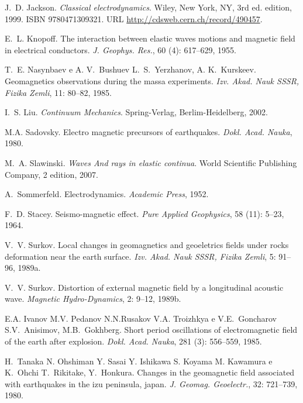 \documentclass[12pt,a4paper,openany]{abntex2}
\begin{document}
\begin{thebibliography}{25}
J.~D. Jackson.
\newblock \emph{Classical electrodynamics}.
\newblock Wiley, New York, {NY}, 3rd ed. edition, 1999.
\newblock ISBN 9780471309321.
\newblock URL \url{http://cdsweb.cern.ch/record/490457}.

E.~L. Knopoff.
\newblock The interaction between elastic waves motions and magnetic field in
  electrical conductors.
\newblock \emph{J. Geophys. Res.}, 60 (4): 617--629, 1955.

T.~E. Nasynbaev e A. V.~Bushuev L.~S.~Yerzhanov, A. K.~Kurskeev.
\newblock Geomagnetics observations during the massa experiments.
\newblock \emph{Izv. Akad. Nauk SSSR, Fizika Zemli}, 11: 80--82, 1985.

I.~S. Liu.
\newblock \emph{Continuum Mechanics}.
\newblock Spring-Verlag, Berlim-Heidelberg, 2002.

M.A. Sadovsky.
\newblock Electro magnetic precursors of earthquakes.
\newblock \emph{Dokl. Acad. Nauka}, 1980.

M.~A. Slawinski.
\newblock \emph{Waves And rays in elastic continua}.
\newblock World Scientific Publishing Company, 2 edition, 2007.


A.~Sommerfeld.
\newblock Electrodynamics.
\newblock \emph{Academic Press}, 1952.

F.~D. Stacey.
\newblock Seismo-magnetic effect.
\newblock \emph{Pure Applied Geophysics}, 58 (11): 5--23,
  1964.

V.~V. Surkov.
\newblock Local changes in geomagnetics and geoeletrics fields under rocks
  deformation near the earth surface.
\newblock \emph{Izv. Akad. Nauk SSSR, Fizika Zemli}, 5: 91--96, 1989a.

V.~V. Surkov.
\newblock Distortion of external magnetic field by a longitudinal acoustic
  wave.
\newblock \emph{Magnetic Hydro-Dynamics}, 2: 9--12, 1989b.

E.A. Ivanov M.V. Pedanov N.N.Rusakov V.A. Troizhkya e V.E.~Goncharov
  S.V.~Anisimov, M.B.~Gokhberg.
\newblock Short period oscillations of electromagnetic field of the earth after
  explosion.
\newblock \emph{Dokl. Acad. Nauka}, 281 (3): 556--559, 1985.

H.~Tanaka N. Ohshiman Y. Sasai Y. Ishikawa S. Koyama M. Kawamura e K.~Ohchi
  T.~Rikitake, Y.~Honkura.
\newblock Changes in the geomagnetic field associated with earthquakes in the
  izu peninsula, japan.
\newblock \emph{J. Geomag. Geoelectr.}, 32: 721--739, 1980.

\end{thebibliography}
\end{document}
